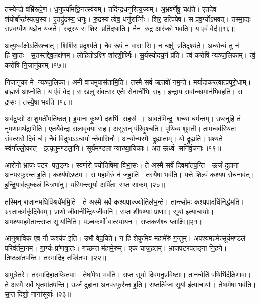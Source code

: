 तस्येन्द्रो वम्रि॑रूपे॒ण। ध॒नुर्ज्या॑मछि॒नत्स्व॑यम्। 
तदि॑न्द्र॒धनु॑रित्य॒ज्यम्। अ॒भ्रव॑र्णेषु॒ चक्ष॑ते। 
एतदेव शंयोर्बार्‌ह॑स्पत्य॒स्य। ए॒तद्रु॑द्रस्य॒ धनुः। 
रु॒द्रस्य॑ त्वेव॒ धनु॑रार्त्निः। शिर॒ उत्पि॑पेष। 
स प्र॑व॒र्ग्यो॑ऽभवत्‌। तस्मा॒द्यः सप्र॑व॒र्ग्येण॑ य॒ज्ञेन॒ यज॑ते। 
रु॒द्रस्य॒ स शिर॒ प्रति॑दधाति। नैन रु॒द्र आरु॑को भवति। य ए॒वं वेद॑॥१६॥\anuvakamend


अ॒त्यू॒र्ध्वा॒क्षोऽति॑रश्चात्‌। शिशि॑रः प्र॒दृश्य॑ते। 
नैव रूपं न॑ वासा॒सि। न चक्षु॑ प्रति॒दृश्य॑ते। 
अ॒न्योन्यं॒ तु न॑ हिस्रा॒तः। स॒तस्त॑द्देव॒लक्ष॑णम्‌। 
लोहितोऽक्ष्णि शा॑रशी॒र्ष्णिः। सू॒र्यस्यो॑दय॒नं प्र॑ति। 
त्वं करोषि॑ न्यञ्ज॒लिकाम्‌। त्वं॒ करो॑षि नि॒जानु॑काम्‌॥१७॥

निजानुका मे न्यञ्ज॒लिका। अमी वाचमुपास॑तामि॒ति। 
तस्मै सर्व ऋतवो॑ नम॒न्ते। मर्यादाकरत्वात्प्र॑\-पुरो॒धाम्। 
ब्राह्मण॑ आप्नो॒ति। य ए॑वं वे॒द। स खलु संवत्सर एतैः सेनानी॑भिः स॒ह। 
इन्द्राय सर्वान्कामान॑भिव॒हति। स द्र॒प्सः। तस्यै॒षा भव॑ति॥१८॥

अव॑द्र॒प्सो अशु॒मती॑मतिष्ठत्‌। इ॒या॒नः कृ॒ष्णो द॒शभि॑ स॒हस्रै। 
आव॒र्तमिन्द्र॒ शच्या॒ धम॑न्तम्‌। उप्स्नुहि तं नृमणामथ॑द्रामि॒ति। 
एतयैवेन्द्रः सलावृ॑क्या स॒ह। असुरान्‌ प॑रिवृ॒श्चति। 
पृथि॑व्य॒शुम॑ती। ताम॒न्वव॑स्थितः संवत्स॒रो दि॒वं च॑। 
नैवं विदुषाऽऽचार्यान्तेवा॒सिनौ। अन्योन्यस्मै द्रुह्या॒ताम्। यो द्रु॒ह्यति। 
भ्रश्यते स्व॑र्गाल्लो॒कात्‌। इत्यृतुम॑ण्डला॒नि। 
सूर्यमण्डलान्या\-ख्या॒यिकाः। अत ऊर्ध्व सनि॑र्व॒चनाः॥१९॥\anuvakamend


आरोगो भ्राजः पटर॑ पत॒ङ्गः। स्वर्णरो ज्योतिषिमा\sn{} विभा॒सः। 
ते अस्मै सर्वे दिवमा॑तप॒न्ति। ऊर्जं दुहाना अनपस्फुर॑न्त इ॒ति। 
कश्य॑पोऽष्ट॒मः। स महामेरुं न॑ जहा॒ति। 
तस्यै॒षा भव॑ति। यत्ते॒ शिल्पं॑ कश्यप रोच॒नाव॑त्‌। 
इ॒न्द्रि॒याव॑त्पुष्क॒लं चि॒त्रभा॑नु। यस्मि॒न्त्सूर्या॒ अर्पि॑ताः स॒प्त सा॒कम्‌॥२०॥

तस्मिन्‌ राजानमधिविश्रये॑ममि॒ति। ते अस्मै सर्वे कश्यपाज्ज्यो\-ति॑र्लभ॒न्ते। 
तान्त्सोमः कश्यपादधि॑निर्द्ध॒मति। भ्रस्ताकर्मकृ॑दिवै॒वम्‌। 
प्राणो जीवानीन्द्रिय॑जीवा॒नि। सप्त शी\ur{}ष॑ण्याः प्रा॒णाः। 
सूर्या इ॑त्याचा॒र्याः। अपश्यमहमेतान्त्सप्त सूर्यानि॒ति। 
पञ्चकर्णो॑ वात्स्या॒यनः। सप्तकर्ण॑श्च प्ला॒क्षिः॥२१॥

आनुश्राविक एव नौ कश्य॑प इ॒ति। उभौ॑ वेद॒यिते। 
न हि शेकुमिव महामे॑रुं ग॒न्तुम्। अपश्यमहमेत्सूर्यमण्डलं परिव॑र्तमा॒नम्। 
गा॒र्ग्यः प्रा॑णत्रा॒तः। गच्छन्त म॑हामे॒रुम्। एकं॑ चाज॒हतम्। 
भ्राजपटरपत॑ङ्गा नि॒हने। तिष्ठन्ना॑तप॒न्ति। तस्मा॑दि॒ह तप्त्रि॑तपाः॥२२॥

अ॒मुत्रे॒तरे। तस्मा॑दि॒हातप्त्रि॑तपाः। तेषा॑मेषा॒ भव॑ति। 
स॒प्त सूर्या॒ दिव॒मनु॒प्रवि॑ष्टाः। तान॒न्वेति॑ प॒थिभि॑र्दक्षि॒णावा\sn{}। 
ते अस्मै सर्वे घृतमा॑तप॒न्ति। ऊर्जं दुहाना अनपस्फुर॑न्त इ॒ति। 
सप्तर्त्विजः सूर्या इ॑त्याचा॒र्याः। तेषा॑मेषा॒ भव॑ति। स॒प्त दिशो॒ नाना॑सूर्याः॥२३॥

